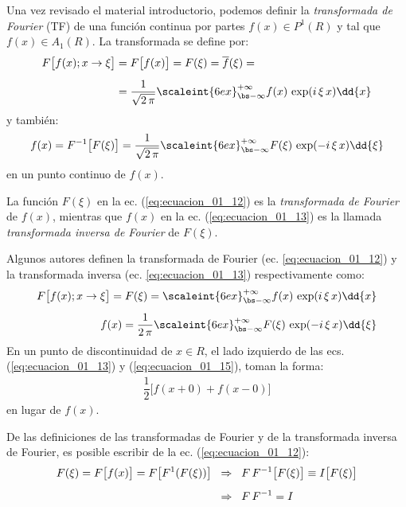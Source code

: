 Una vez revisado el material introductorio, podemos definir la \emph{transformada de Fourier} (TF) de una función continua por partes $f(x) \in P^{1} (R)$ y tal que $f(x) \in A_{1} (R)$. La transformada se define por:
\begin{align}
\begin{aligned}[b]
F \big[ f(x); x \to \xi \big] &= F \big[ f(x) \big] = F(\xi) = \overline{f} (\xi) = \\[0.5em] 
&= \dfrac{1}{\sqrt{2 \, \pi}} \scaleint{6ex}_{\bs -\infty}^{+\infty} f(x) \, \exp(i \, \xi \, x) \dd{x}
\end{aligned}
\label{eq:ecuacion_01_12}
\end{align}
y también:
\begin{align}
f(x) = F^{-1} \big[ F(\xi) \big] = \dfrac{1}{\sqrt{2 \, \pi}} \scaleint{6ex}_{\bs -\infty}^{+\infty} F(\xi) \, \exp(-i \, \xi \, x) \dd{\xi}
\label{eq:ecuacion_01_13}
\end{align}
en un punto continuo de $f(x)$.
\par
La función $F(\xi)$ en la ec. (\ref{eq:ecuacion_01_12}) es la \emph{transformada de Fourier} de $f(x)$, mientras que $f(x)$ en la ec. (\ref{eq:ecuacion_01_13}) es la llamada \emph{transformada inversa de Fourier} de $F(\xi)$.
\par
Algunos autores definen la transformada de Fourier  (ec. \ref{eq:ecuacion_01_12}) y la transformada inversa (ec. \ref{eq:ecuacion_01_13}) respectivamente como:
\begin{align}
F \big[ f(x); x \to \xi \big] = F(\xi) = \scaleint{6ex}_{\bs -\infty}^{+\infty} f(x) \, \exp(i \, \xi \, x) \dd{x} \label{eq:ecuacion_01_14} \\[0.5em]
f(x) = \dfrac{1}{2 \, \pi} \scaleint{6ex}_{\bs -\infty}^{+\infty} F(\xi) \, \exp(-i \, \xi \, x) \dd{\xi}
\label{eq:ecuacion_01_15}
\end{align}
En un punto de discontinuidad de $x \in R$, el lado izquierdo de las ecs. (\ref{eq:ecuacion_01_13}) y (\ref{eq:ecuacion_01_15}), toman la forma:
\begin{align*}
\dfrac{1}{2} \big[ f(x + 0) + f(x - 0) \big]
\end{align*}
en lugar de $f(x)$.
\par
De las definiciones de las transformadas de Fourier y de la transformada inversa de Fourier, es posible escribir de la ec. (\ref{eq:ecuacion_01_12}):
\begin{align*}
F(\xi) = F \big[f(x) \big] = F \big[ F^{1} (F(\xi)) \big] \hspace{0.2cm} &\Rightarrow \hspace{0.2cm} F \, F^{-1} \big[ F(\xi) \big] \equiv I \big[ F(\xi)\big] \\[0.5em]
&\Rightarrow \hspace{0.2cm} F \, F^{-1} = I
\end{align*}

